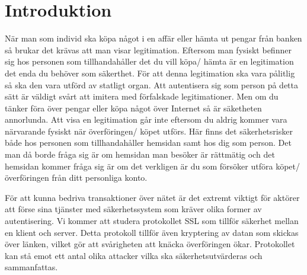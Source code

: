 \section{Introduktion}

När man som individ ska köpa något i en affär eller hämta ut pengar från banken så brukar det krävas att man visar legitimation. Eftersom man fysiskt befinner sig hos personen som tillhandahåller det du vill köpa/ hämta är en legitimation det enda du behöver som säkerthet. För att denna legitimation ska vara pålitlig så ska den vara utförd av statligt organ. Att autentisera sig som person på detta sätt är väldigt svårt att imitera med förfalskade legitimationer. Men om du tänker föra över pengar eller köpa något över Internet så är säketheten annorlunda. Att visa en legitimation går inte eftersom du aldrig kommer vara närvarande fysiskt när överföringen/ köpet utförs. Här finns det säkerhetsrisker både hos personen som tillhandahåller hemsidan samt hos dig som person. Det man då borde fråga sig är om hemsidan man besöker är rättmätig och det hemsidan kommer fråga sig är om det verkligen är du som försöker utföra köpet/ överföringen från ditt personliga konto.

För att kunna bedriva transaktioner över nätet är det extremt viktigt för aktörer att förse sina tjänster med säkerhetssystem som kräver olika former av autentisering. Vi kommer att studera protokollet SSL som tillför säkerhet mellan en klient och server. Detta protokoll tillför även kryptering av datan som skickas över länken, vilket gör att svårigheten att knäcka överföringen ökar. Protokollet kan stå emot ett antal olika attacker vilka ska säkerhetsutvärderas och sammanfattas. 

